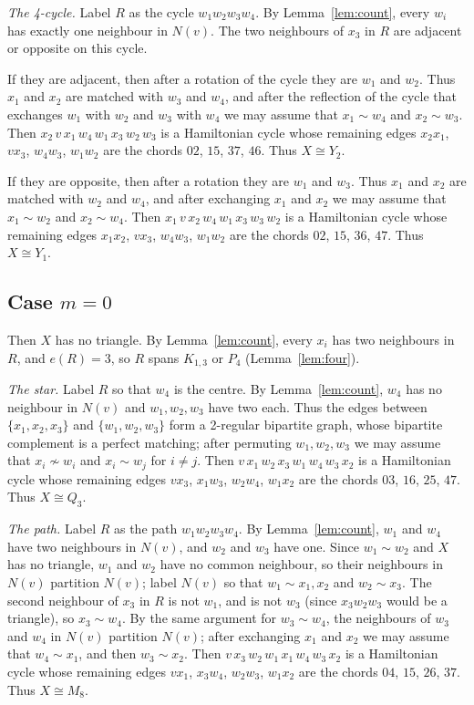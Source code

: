 \documentclass[11pt]{amsart}
\theoremstyle{definition}
\newcommand{\nb}{N}
\begin{document}
\emph{The 4-cycle.} Label $R$ as the cycle $w_1w_2w_3w_4$. By Lemma~\ref{lem:count}, every $w_i$
has exactly one neighbour in $\nb(v)$. The two neighbours of $x_3$ in $R$ are adjacent or opposite
on this cycle.

If they are adjacent, then after a rotation of the cycle they are $w_1$ and $w_2$. Thus $x_1$ and
$x_2$ are matched with $w_3$ and $w_4$, and after the reflection of the cycle that exchanges $w_1$
with $w_2$ and $w_3$ with $w_4$ we may assume that $x_1\sim w_4$ and $x_2\sim w_3$. Then
$x_2\,v\,x_1\,w_4\,w_1\,x_3\,w_2\,w_3$ is a Hamiltonian cycle whose remaining edges $x_2x_1$,
$vx_3$, $w_4w_3$, $w_1w_2$ are the chords $02$, $15$, $37$, $46$. Thus $X\cong Y_2$.

If they are opposite, then after a rotation they are $w_1$ and $w_3$. Thus $x_1$ and $x_2$ are
matched with $w_2$ and $w_4$, and after exchanging $x_1$ and $x_2$ we may assume that $x_1\sim w_2$
and $x_2\sim w_4$. Then $x_1\,v\,x_2\,w_4\,w_1\,x_3\,w_3\,w_2$ is a Hamiltonian cycle whose
remaining edges $x_1x_2$, $vx_3$, $w_4w_3$, $w_1w_2$ are the chords $02$, $15$, $36$, $47$. Thus
$X\cong Y_1$.

\subsection*{\texorpdfstring{Case $m=0$}{Case m=0}}
Then $X$ has no triangle. By Lemma~\ref{lem:count}, every $x_i$ has two neighbours in $R$, and
$e(R)=3$, so $R$ spans $K_{1,3}$ or $P_4$ (Lemma~\ref{lem:four}).

\emph{The star.} Label $R$ so that $w_4$ is the centre. By Lemma~\ref{lem:count}, $w_4$ has no
neighbour in $\nb(v)$ and $w_1,w_2,w_3$ have two each. Thus the edges between $\{x_1,x_2,x_3\}$ and
$\{w_1,w_2,w_3\}$ form a 2-regular bipartite graph, whose bipartite complement is a perfect
matching; after permuting $w_1,w_2,w_3$ we may assume that $x_i\not\sim w_i$ and $x_i\sim w_j$ for
$i\ne j$. Then $v\,x_1\,w_2\,x_3\,w_1\,w_4\,w_3\,x_2$ is a Hamiltonian cycle whose remaining edges
$vx_3$, $x_1w_3$, $w_2w_4$, $w_1x_2$ are the chords $03$, $16$, $25$, $47$. Thus $X\cong Q_3$.

\emph{The path.} Label $R$ as the path $w_1w_2w_3w_4$. By Lemma~\ref{lem:count}, $w_1$ and $w_4$
have two neighbours in $\nb(v)$, and $w_2$ and $w_3$ have one. Since $w_1\sim w_2$ and $X$ has no
triangle, $w_1$ and $w_2$ have no common neighbour, so their neighbours in $\nb(v)$ partition
$\nb(v)$; label $\nb(v)$ so that $w_1\sim x_1,x_2$ and $w_2\sim x_3$. The second neighbour of $x_3$
in $R$ is not $w_1$, and is not $w_3$ (since $x_3w_2w_3$ would be a triangle), so $x_3\sim w_4$. By
the same argument for $w_3\sim w_4$, the neighbours of $w_3$ and $w_4$ in $\nb(v)$ partition
$\nb(v)$; after exchanging $x_1$ and $x_2$ we may assume that $w_4\sim x_1$, and then $w_3\sim x_2$.
Then $v\,x_3\,w_2\,w_1\,x_1\,w_4\,w_3\,x_2$ is a Hamiltonian cycle whose remaining edges $vx_1$,
$x_3w_4$, $w_2w_3$, $w_1x_2$ are the chords $04$, $15$, $26$, $37$. Thus $X\cong M_8$.
\end{document}
